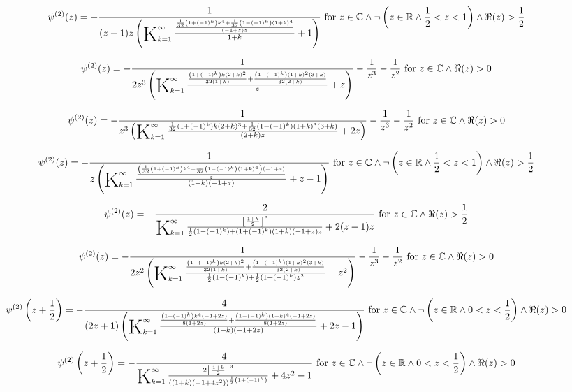 \documentclass{article}
\newcommand{\bigK}{\mathop{\raisebox{-5pt}{\huge K}}}
\begin{document}
\[\psi ^{(2)}(z)=-\frac{1}{(z-1) z \left(\bigK_{k=1}^{\infty}\frac{\frac{\frac{1}{32} \left(1+(-1)^k\right) k^4+\frac{1}{32} \left(1-(-1)^k\right) (1+k)^4}{(-1+z) z}}{1+k}+1\right)}\text{ for }z\in \mathbb{C}\land \neg \left(z\in \mathbb{R}\land \frac{1}{2}<z<1\right)\land \Re(z)>\frac{1}{2}\] 

\[\psi ^{(2)}(z)=-\frac{1}{2 z^3 \left(\bigK_{k=1}^{\infty}\frac{\frac{\left(1+(-1)^k\right) k (2+k)^2}{32 (1+k)}+\frac{\left(1-(-1)^k\right) (1+k)^2 (3+k)}{32 (2+k)}}{z}+z\right)}-\frac{1}{z^3}-\frac{1}{z^2}\text{ for }z\in \mathbb{C}\land \Re(z)>0\] 

\[\psi ^{(2)}(z)=-\frac{1}{z^3 \left(\bigK_{k=1}^{\infty}\frac{\frac{1}{32} \left(1+(-1)^k\right) k (2+k)^3+\frac{1}{32} \left(1-(-1)^k\right) (1+k)^3 (3+k)}{(2+k) z}+2 z\right)}-\frac{1}{z^3}-\frac{1}{z^2}\text{ for }z\in \mathbb{C}\land \Re(z)>0\] 

\[\psi ^{(2)}(z)=-\frac{1}{z \left(\bigK_{k=1}^{\infty}\frac{\frac{\left(\frac{1}{32} \left(1+(-1)^k\right) k^4+\frac{1}{32} \left(1-(-1)^k\right) (1+k)^4\right) (-1+z)}{z}}{(1+k) (-1+z)}+z-1\right)}\text{ for }z\in \mathbb{C}\land \neg \left(z\in \mathbb{R}\land \frac{1}{2}<z<1\right)\land \Re(z)>\frac{1}{2}\] 

\[\psi ^{(2)}(z)=-\frac{2}{\bigK_{k=1}^{\infty}\frac{\left\lfloor \frac{1+k}{2}\right\rfloor ^3}{\frac{1}{2} \left(1-(-1)^k\right)+\left(1+(-1)^k\right) (1+k) (-1+z) z}+2 (z-1) z}\text{ for }z\in \mathbb{C}\land \Re(z)>\frac{1}{2}\] 

\[\psi ^{(2)}(z)=-\frac{1}{2 z^2 \left(\bigK_{k=1}^{\infty}\frac{\frac{\left(1+(-1)^k\right) k (2+k)^2}{32 (1+k)}+\frac{\left(1-(-1)^k\right) (1+k)^2 (3+k)}{32 (2+k)}}{\frac{1}{2} \left(1-(-1)^k\right)+\frac{1}{2} \left(1+(-1)^k\right) z^2}+z^2\right)}-\frac{1}{z^3}-\frac{1}{z^2}\text{ for }z\in \mathbb{C}\land \Re(z)>0\] 

\[\psi ^{(2)}\left(z+\frac{1}{2}\right)=-\frac{4}{(2 z+1) \left(\bigK_{k=1}^{\infty}\frac{\frac{\left(1+(-1)^k\right) k^4 (-1+2 z)}{8 (1+2 z)}+\frac{\left(1-(-1)^k\right) (1+k)^4 (-1+2 z)}{8 (1+2 z)}}{(1+k) (-1+2 z)}+2 z-1\right)}\text{ for }z\in \mathbb{C}\land \neg \left(z\in \mathbb{R}\land 0<z<\frac{1}{2}\right)\land \Re(z)>0\] 

\[\psi ^{(2)}\left(z+\frac{1}{2}\right)=-\frac{4}{\bigK_{k=1}^{\infty}\frac{2 \left\lfloor \frac{1+k}{2}\right\rfloor ^3}{\left((1+k) \left(-1+4 z^2\right)\right)^{\frac{1}{2} \left(1+(-1)^k\right)}}+4 z^2-1}\text{ for }z\in \mathbb{C}\land \neg \left(z\in \mathbb{R}\land 0<z<\frac{1}{2}\right)\land \Re(z)>0\] 
\end{document}
